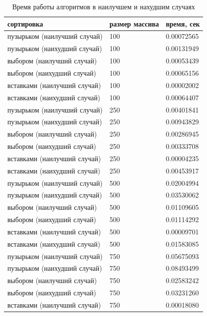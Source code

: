 \documentclass[12pt]{report}
\begin{document}
\begin{table}[H]
	\caption{\label{tabular:rand} Время работы алгоритмов в наилучшем и нахудшим случаях}
	\begin{center}
		
		\begin{tabular}{ | l | l | l | }
			\hline
			сортировка & размер массива & время, сек\\
			\hline
			пузырьком (наилучший случай) & 100 & 0.00072565 \\
			пузырьком (наихудший случай) & 100 & 0.00131949 \\
			выбором (наилучший случай) & 100 & 0.00053439 \\
			выбором (наихудший случай) & 100 & 0.00065156 \\
			вставками (наилучший случай) & 100 & 0.00002002 \\
			вставками (наихудший случай) & 100 & 0.00064407 \\
			\hline
			пузырьком (наилучший случай) & 250 & 0.00401841 \\
			пузырьком (наихудший случай) & 250 & 0.00943829 \\
			выбором (наилучший случай) & 250 & 0.00286945 \\
			выбором (наихудший случай) & 250 & 0.00333708 \\
			вставками (наилучший случай) & 250 & 0.00004235 \\
			вставками (наихудший случай) & 250 & 0.00453917 \\
			\hline
			пузырьком (наилучший случай) & 500 & 0.02004994 \\
			пузырьком (наихудший случай) & 500 & 0.03530062 \\
			выбором (наилучший случай) & 500 & 0.01109605 \\
			выбором (наихудший случай) & 500 & 0.01114292 \\
			вставками (наилучший случай) & 500 & 0.00009701 \\
			вставками (наихудший случай) & 500 & 0.01583085 \\
			\hline
						пузырьком (наилучший случай) & 750 & 0.05675093 \\
			пузырьком (наихудший случай) & 750 & 0.08493499 \\
			выбором (наилучший случай) & 750 & 0.02583242 \\
			выбором (наихудший случай) & 750 & 0.03231260 \\
			вставками (наилучший случай) & 750 & 0.00018080 \\

\end{tabular}
\end{center}
\end{table}
\end{document}

